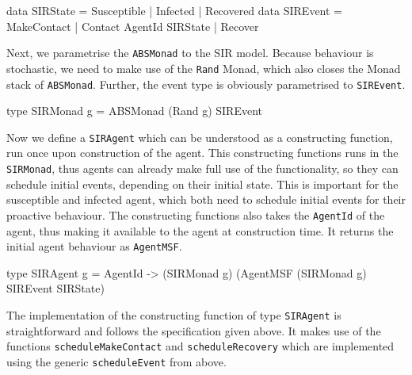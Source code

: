 \begin{HaskellCode}
data SIRState = Susceptible | Infected | Recovered
data SIREvent = MakeContact | Contact AgentId SIRState | Recover 
\end{HaskellCode}

Next, we parametrise the \texttt{ABSMonad} to the SIR model. Because behaviour is stochastic, we need to make use of the \texttt{Rand} Monad, which also closes the Monad stack of \texttt{ABSMonad}. Further, the event type is obviously parametrised to \texttt{SIREvent}.

\begin{HaskellCode}
type SIRMonad g = ABSMonad (Rand g) SIREvent
\end{HaskellCode}

Now we define a \texttt{SIRAgent} which can be understood as a constructing function, run once upon construction of the agent. This constructing functions runs in the \texttt{SIRMonad}, thus agents can already make full use of the functionality, so they can schedule initial events, depending on their initial state. This is important for the susceptible and infected agent, which both need to schedule initial events for their proactive behaviour. The constructing functions also takes the \texttt{AgentId} of the agent, thus making it available to the agent at construction time. It returns the initial agent behaviour as \texttt{AgentMSF}.

\begin{HaskellCode}
type SIRAgent g 
       = AgentId -> (SIRMonad g) (AgentMSF (SIRMonad g) SIREvent SIRState)
\end{HaskellCode}

The implementation of the constructing function of type \texttt{SIRAgent} is straightforward and follows the specification given above. It makes use of the functions \texttt{scheduleMakeContact} and \texttt{scheduleRecovery} which are implemented using the generic \texttt{scheduleEvent} from above.


